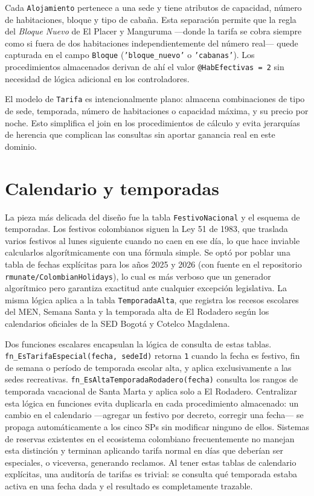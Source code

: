 \documentclass[12pt, letterpaper]{article}
\begin{document}
Cada \texttt{Alojamiento} pertenece a una sede y tiene atributos de capacidad, número de habitaciones, bloque y tipo de cabaña. Esta separación permite que la regla del \emph{Bloque Nuevo} de El Placer y Manguruma ---donde la tarifa se cobra siempre como si fuera de dos habitaciones independientemente del número real--- quede capturada en el campo \texttt{Bloque} (\texttt{'bloque\_nuevo'} o \texttt{'cabanas'}). Los procedimientos almacenados derivan de ahí el valor \texttt{@HabEfectivas = 2} sin necesidad de lógica adicional en los controladores.

El modelo de \texttt{Tarifa} es intencionalmente plano: almacena combinaciones de tipo de sede, temporada, número de habitaciones o capacidad máxima, y su precio por noche. Esto simplifica el join en los procedimientos de cálculo y evita jerarquías de herencia que complican las consultas sin aportar ganancia real en este dominio.

\section{Calendario y temporadas}

La pieza más delicada del diseño fue la tabla \texttt{FestivoNacional} y el esquema de temporadas. Los festivos colombianos siguen la Ley 51 de 1983, que traslada varios festivos al lunes siguiente cuando no caen en ese día, lo que hace inviable calcularlos algorítmicamente con una fórmula simple. Se optó por poblar una tabla de fechas explícitas para los años 2025 y 2026 (con fuente en el repositorio \texttt{rmunate/ColombianHolidays}), lo cual es más verboso que un generador algorítmico pero garantiza exactitud ante cualquier excepción legislativa. La misma lógica aplica a la tabla \texttt{TemporadaAlta}, que registra los recesos escolares del MEN, Semana Santa y la temporada alta de El Rodadero según los calendarios oficiales de la SED Bogotá y Cotelco Magdalena.

Dos funciones escalares encapsulan la lógica de consulta de estas tablas. \texttt{fn\_EsTarifaEspecial(fecha, sedeId)} retorna \texttt{1} cuando la fecha es festivo, fin de semana o período de temporada escolar alta, y aplica exclusivamente a las sedes recreativas. \texttt{fn\_EsAltaTemporadaRodadero(fecha)} consulta los rangos de temporada vacacional de Santa Marta y aplica solo a El Rodadero. Centralizar esta lógica en funciones evita duplicarla en cada procedimiento almacenado: un cambio en el calendario ---agregar un festivo por decreto, corregir una fecha--- se propaga automáticamente a los cinco SPs sin modificar ninguno de ellos. Sistemas de reservas existentes en el ecosistema colombiano frecuentemente no manejan esta distinción y terminan aplicando tarifa normal en días que deberían ser especiales, o viceversa, generando reclamos. Al tener estas tablas de calendario explícitas, una auditoría de tarifas es trivial: se consulta qué temporada estaba activa en una fecha dada y el resultado es completamente trazable.
\end{document}
